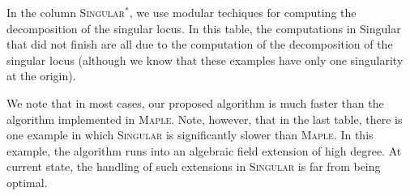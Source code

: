\documentclass[a4paper,11pt]{amsart}%
\theoremstyle{definition}
\theoremstyle{plain}
\theoremstyle{remark}
\begin{document}
In the column \textsc{Singular}{}$^{*}$, we use modular techiques for
computing the decomposition of the singular locus. \newpage In this table, the
computations in Singular that did not finish are all due to the computation of
the
 decomposition of the
singular locus (although we know that these examples have only one singularity
at the origin).

\vspace{0.5cm}

We note that in most cases, our proposed algorithm is much faster than the
algorithm implemented in \textsc{Maple}{}. Note, however, that in the last
table, there is one example in which \textsc{Singular}{} is significantly
slower than \textsc{Maple}{}. In this example, the algorithm runs into an
algebraic field extension of high degree. At current state, the handling of
such extensions in \textsc{Singular}{} is far from being optimal.




\end{document}
